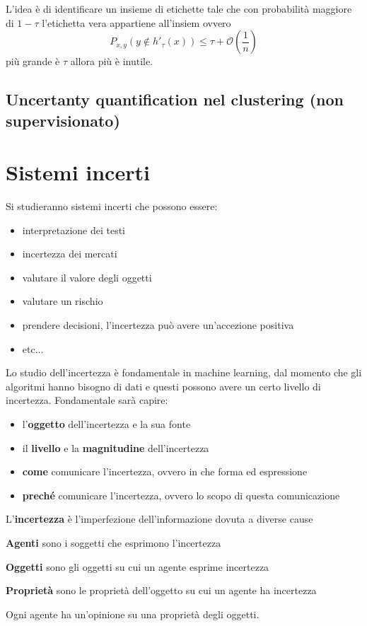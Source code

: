 L'idea è di identificare un insieme di etichette tale che con probabilità maggiore
di $1-\tau$ l'etichetta vera appartiene all'insiem ovvero 
$$P_{x,y}(y\not \in h'_\tau(x))\le \tau + \mathcal{O}(\frac{1}{n})$$
più grande è $\tau$ allora più è inutile.



\section*{Uncertanty quantification nel clustering (non supervisionato)}
\chapter{Sistemi incerti}
Si studieranno sistemi incerti che possono essere:
\begin{itemize}
    \item interpretazione dei testi
    \item incertezza dei mercati
    \item valutare il valore degli oggetti
    \item valutare un rischio
    \item prendere decisioni, l'incertezza può avere un'accezione positiva
    \item etc$\dots$
\end{itemize}

Lo studio dell'incertezza è fondamentale in machine learning, dal momento che 
gli algoritmi hanno bisogno di dati e questi possono avere un certo livello di 
incertezza. Fondamentale sarà capire:
\begin{itemize}
    \item l'\textbf{oggetto} dell'incertezza e la sua fonte
    \item il \textbf{livello} e la \textbf{magnitudine} dell'incertezza
    \item \textbf{come} comunicare l'incertezza, ovvero in che forma ed espressione
    \item \textbf{preché} comunicare l'incertezza, ovvero lo scopo di questa comunicazione
\end{itemize}

\begin{definizione}
    L'\textbf{incertezza}  è l'imperfezione dell'informazione dovuta a diverse cause
\end{definizione}
\begin{definizione}
    \textbf{Agenti} sono i soggetti che esprimono l'incertezza
\end{definizione}
\begin{definizione}
    \textbf{Oggetti} sono gli oggetti su cui un agente esprime incertezza
\end{definizione}
\begin{definizione}
    \textbf{Proprietà} sono le proprietà dell'oggetto su cui un agente ha incertezza
\end{definizione}
Ogni agente ha un'opinione su una proprietà degli oggetti.

